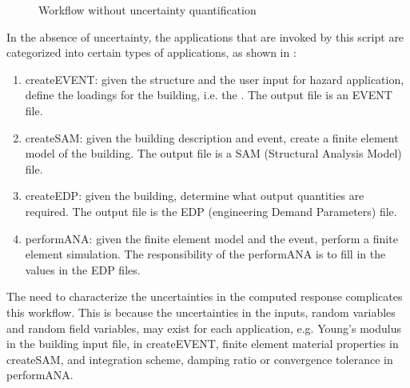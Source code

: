 \begin{figure}[!htbp]
  \caption{Workflow without uncertainty quantification}
  \label{fig:figure17}
\end{figure}


In the absence of uncertainty, the applications that are invoked by
this script are categorized into certain types of applications, as shown 
in :
\begin{enumerate}
\item createEVENT: given the structure and the user input for hazard
  application, define the loadings for the building, i.e. the
  . The output
  file is an EVENT file.
\item createSAM: given the building description and event, create a
  finite element model of the building. The output file is a SAM
  (Structural Analysis Model) file.
\item createEDP: given the building, determine what output quantities
  are required. The output file is the EDP (engineering Demand
  Parameters) file.
\item performANA: given the finite element model and the event,
  perform a finite element simulation. The responsibility of the
  performANA is to fill in the values in the EDP files.
\end{enumerate}


The need to characterize the uncertainties in the computed response
complicates this workflow. This is because the uncertainties in the
inputs, random variables and random field variables, may exist for
each application, e.g. Young’s modulus in the building input file,
 in createEVENT, finite
element material properties in createSAM, and integration scheme,
damping ratio or convergence tolerance in performANA.

